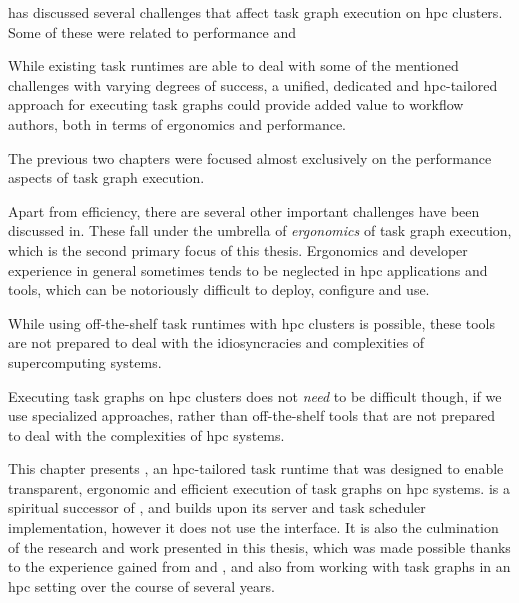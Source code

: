  has discussed several challenges that affect task graph execution on \gls{hpc}
clusters. Some of these were related to performance and

While existing task runtimes are able to deal with some of the
mentioned challenges with varying degrees of success, a unified, dedicated and
\gls{hpc}-tailored approach for executing task graphs could provide added value
to workflow authors, both in terms of ergonomics and performance.

The previous two chapters were focused almost exclusively on the performance aspects of task graph execution.

Apart from efficiency, there are several other important challenges have been discussed in.
These fall under the umbrella of \emph{ergonomics} of task graph execution, which is the second primary
focus of this thesis. Ergonomics and developer experience in general sometimes tends to be neglected in \gls{hpc}
applications and tools, which can be notoriously difficult to deploy, configure and use.

While using off-the-shelf task runtimes with \gls{hpc} clusters is possible, these tools are not prepared
to deal with the idiosyncracies and complexities of supercomputing systems.

Executing task graphs on \gls{hpc} clusters does not \emph{need} to be difficult though, if
we use specialized approaches, rather than off-the-shelf tools that are not prepared to deal with
the complexities of \gls{hpc} systems.




This chapter presents \hyperqueue{}, an \gls{hpc}-tailored task runtime that
was designed to enable transparent, ergonomic and efficient execution of task graphs on
\gls{hpc} systems. \hyperqueue{} is a spiritual successor of
\rsds{}, and builds upon its server and task scheduler implementation, however it
does not use the \dask{} interface. It is also the culmination of the research and
work presented in this thesis, which was made possible thanks to the experience gained from
\estee{} and \rsds{}, and also from working with task graphs in an
\gls{hpc} setting over the course of several years.

